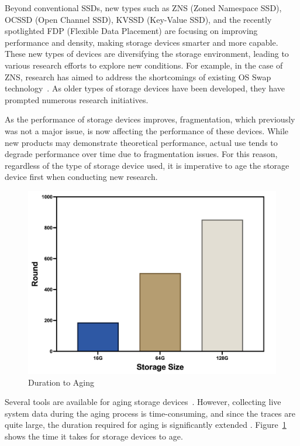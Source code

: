 Beyond conventional SSDs, new types such as ZNS (Zoned Namespace SSD), OCSSD (Open Channel SSD), KVSSD (Key-Value SSD), and the recently spotlighted FDP (Flexible Data Placement) are focusing on improving performance and density, making storage devices smarter and more capable.
These new types of devices are diversifying the storage environment, leading to various research efforts to explore new conditions.
For example, in the case of ZNS, research has aimed to address the shortcomings of existing OS Swap technology~\cite{znswap}.
As older types of storage devices have been developed, they have prompted numerous research initiatives.

As the performance of storage devices improves, fragmentation, which previously was not a major issue, is now affecting the performance of these devices.
While new products may demonstrate theoretical performance, actual use tends to degrade performance over time due to fragmentation issues.
For this reason, regardless of the type of storage device used, it is imperative to age the storage device first when conducting new research.
\begin{figure}[h]
    \centering
    \includegraphics[width=0.95\columnwidth]{graphs/aging_duration}
    \caption{Duration to Aging}
    \label{fig:aging-duration}
\end{figure}
Several tools are available for aging storage devices~\cite{tbbt:fast05, impressions:fast09, conway:login17}.
However, collecting live system data during the aging process is time-consuming, and since the traces are quite large, the duration required for aging is significantly extended \cite{fs-aging:sigmetrics97}.
Figure~\ref{fig:aging-duration} shows the time it takes for storage devices to age. 
